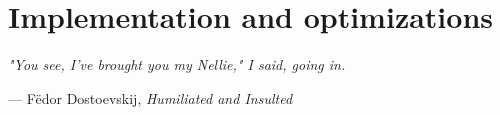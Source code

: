 \documentclass[12pt,	%
	a4paper,		%
	twoside,		%
	openright,		%
	titlepage,%
	]{book}
\theoremstyle{definition}
\let\cite\citep
\begin{document}




\chapter{Implementation and optimizations}
\label{Implementation and optimizations}


\epigraph{\itshape \flushright
"You see, I've brought you my Nellie," I said, going in.
}{--- F\"{e}dor Dostoevskij, \textit{Humiliated and Insulted}}





\end{document}
